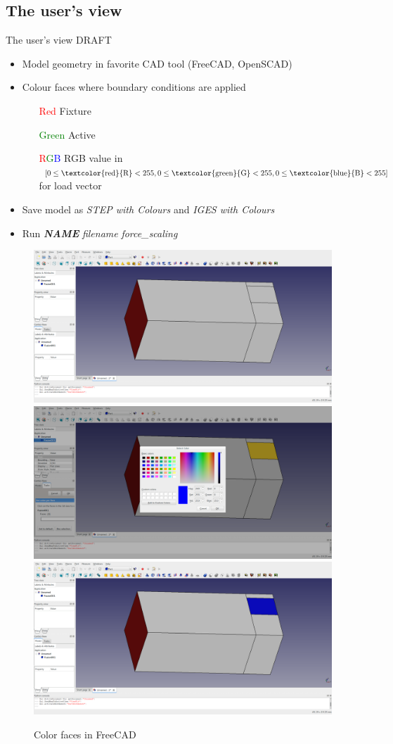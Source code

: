 \subsection{The user's view}
\begin{frame}{The user's view DRAFT}
\begin{minipage}{0.65\textwidth}
\begin{overlayarea}{\textwidth}{.9\textheight}
\begin{itemize}
	\item Model geometry in favorite CAD tool (FreeCAD, OpenSCAD)
	\item Colour faces where boundary conditions are applied
	\begin{itemize}
		\item[\textcolor{red}{Red}] Fixture
		\item[\textcolor{green}{Green}] Active
		\item[\textcolor{red}{R}\textcolor{green}{G}\textcolor{blue}{B}] RGB value in $[0 \leq \text{\textcolor{red}{R}} < 255,0 \leq \text{\textcolor{green}{G}} < 255,0 \leq \text{\textcolor{blue}{B}} < 255]$ for load vector
	\end{itemize}
	\item Save model as \textit{STEP with Colours} and \textit{IGES with Colours}
	\item Run \textit{\textbf{NAME}} \textit{filename} \textit{force{\_}scaling}
\end{itemize}
\begin{figure}[htp]
\centering
\includegraphics[width=.3\textwidth]{Pictures/TopOp/CantileverFCAD1.png}\hfill
\includegraphics[width=.3\textwidth]{Pictures/TopOp/CantileverFCAD2.png}\hfill
\includegraphics[width=.3\textwidth]{Pictures/TopOp/CantileverFCAD3.png}
\caption{Color faces in FreeCAD}

\end{figure}
\end{overlayarea}
\end{minipage}
\end{frame}
